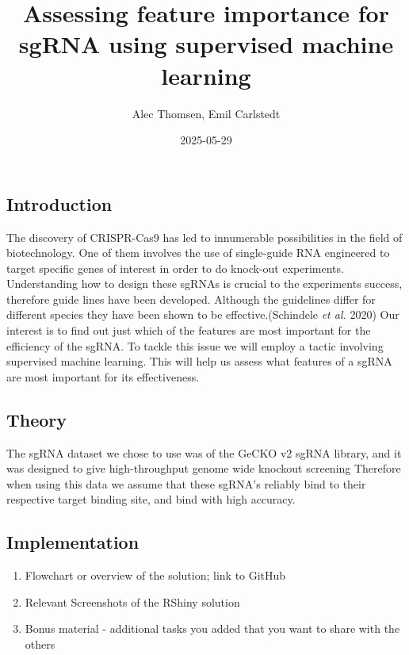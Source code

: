 \documentclass[
]{article}
\title{Assessing feature importance for sgRNA using supervised machine
learning}
\author{Alec Thomsen, Emil Carlstedt}
\date{2025-05-29}
\providecommand{\tightlist}{%
  \setlength{\itemsep}{0pt}\setlength{\parskip}{0pt}}
\begin{document}
\maketitle

\subsection{Introduction}\label{introduction}

The discovery of CRISPR-Cas9 has led to innumerable possibilities in the
field of biotechnology. One of them involves the use of single-guide RNA
engineered to target specific genes of interest in order to do knock-out
experiments. Understanding how to design these sgRNAs is crucial to the
experiments success, therefore guide lines have been developed. Although
the guidelines differ for different species they have been shown to be
effective.(Schindele \emph{et al.} 2020) Our interest is to find out
just which of the features are most important for the efficiency of the
sgRNA. To tackle this issue we will employ a tactic involving supervised
machine learning. This will help us assess what features of a sgRNA are
most important for its effectiveness.

\subsection{Theory}\label{theory}

The sgRNA dataset we chose to use was of the GeCKO v2 sgRNA library, and
it was designed to give high-throughput genome wide knockout screening
Therefore when using this data we assume that these sgRNA's reliably
bind to their respective target binding site, and bind with high
accuracy.

\subsection{Implementation}\label{implementation}

\begin{enumerate}
\def\labelenumi{\arabic{enumi}.}
\tightlist
\item
  Flowchart or overview of the solution; link to GitHub\\
\item
  Relevant Screenshots of the RShiny solution\\
\item
  Bonus material - additional tasks you added that you want to share
  with the others
\end{enumerate}
\end{document}
